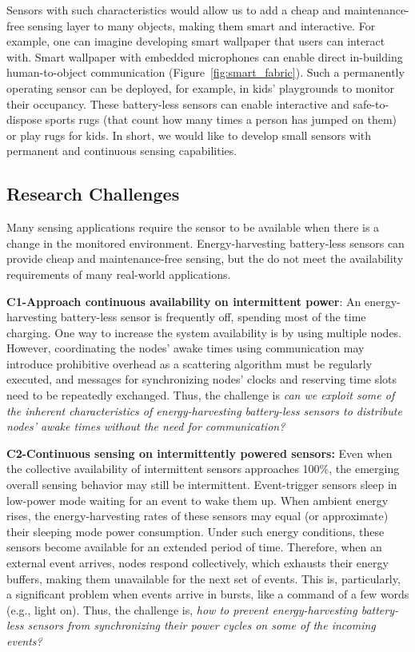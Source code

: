 Sensors with such characteristics would allow us to add a cheap and maintenance-free sensing layer to many objects, making them smart and interactive. 
For example, one can imagine developing smart wallpaper that users can interact with. 
Smart wallpaper with embedded microphones can enable direct in-building human-to-object communication (Figure~\ref{fig:smart_fabric}). Such a permanently operating sensor can be deployed, for example, in kids' playgrounds to monitor their occupancy. These battery-less sensors can enable
interactive and safe-to-dispose sports rugs (that count how many times a person has jumped on them) or play rugs for kids.
In short, we would like to develop small sensors with permanent and continuous sensing capabilities.  
%
\subsection{Research Challenges}
Many sensing applications require the sensor to be available when there is a change in the monitored environment.
Energy-harvesting battery-less sensors can provide cheap and maintenance-free sensing, but the do not meet the availability requirements of many real-world applications. 

\noindent\textbf{C1-Approach continuous availability on intermittent power}: 
An energy-harvesting battery-less sensor is frequently off, spending most of the time charging. 
One way to increase the system availability is by using multiple nodes.
However, coordinating the nodes' awake times using communication may introduce prohibitive overhead as a scattering algorithm must be regularly executed, and messages for synchronizing nodes' clocks and reserving time slots need to be repeatedly exchanged.
Thus, the challenge is \emph{can we exploit some of the inherent characteristics of energy-harvesting battery-less sensors to distribute nodes' awake times without the need for communication?}

\noindent\textbf{C2-Continuous sensing on intermittently powered sensors:}  
Even when the collective availability of intermittent sensors approaches 100\%, the emerging overall sensing behavior may still be intermittent. 
Event-trigger sensors sleep in low-power mode waiting for an event to wake them up. 
When ambient energy rises, the energy-harvesting rates of these sensors may equal (or approximate) their sleeping mode power consumption.
Under such energy conditions, these sensors become available for an extended period of time. 
Therefore, when an external event arrives, nodes respond collectively, which exhausts their energy buffers, making them unavailable for the next set of events. 
This is, particularly, a significant problem when events arrive in bursts, like a command of a few words (e.g., light on). 
Thus, the challenge is, \emph{how to prevent energy-harvesting battery-less sensors from synchronizing their power cycles on some of the incoming events?}

